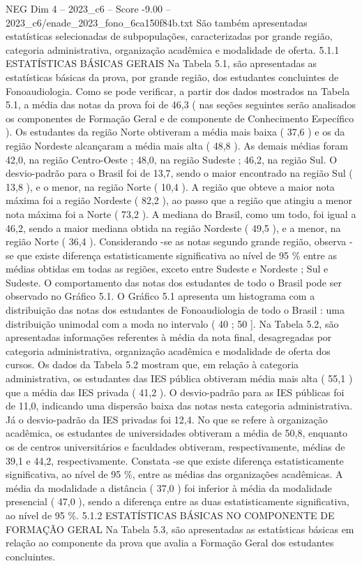 \begin{textsample}{NEG Dim 4 – 2023\_c6 – Score -9.00 – 2023\_c6/enade\_2023\_fono\_6ca150f84b.txt}
São também apresentadas estatísticas selecionadas de subpopulações, caracterizadas por grande região, categoria administrativa, organização acadêmica e modalidade de oferta. 5.1.1 ESTATÍSTICAS BÁSICAS GERAIS Na Tabela 5.1, são apresentadas as estatísticas básicas da prova, por grande região, dos estudantes concluintes de Fonoaudiologia.
Como se pode verificar, a partir dos dados mostrados na Tabela 5.1, a média das notas da prova foi de 46,3 ( nas seções seguintes serão analisados os componentes de Formação Geral e de componente de Conhecimento Específico ).
Os estudantes da região Norte obtiveram a média mais baixa ( 37,6 ) e os da região Nordeste alcançaram a média mais alta ( 48,8 ).
As demais médias foram 42,0, na região Centro-Oeste ; 48,0, na região Sudeste ; 46,2, na região Sul.
O desvio-padrão para o Brasil foi de 13,7, sendo o maior encontrado na região Sul ( 13,8 ), e o menor, na região Norte ( 10,4 ).
A região que obteve a maior nota máxima foi a região Nordeste ( 82,2 ), ao passo que a região que atingiu a menor nota máxima foi a Norte ( 73,2 ).
A mediana do Brasil, como um todo, foi igual a 46,2, sendo a maior mediana obtida na região Nordeste ( 49,5 ), e a menor, na região Norte ( 36,4 ).
Considerando -se as notas segundo grande região, observa -se que existe diferença estatisticamente significativa ao nível de 95 \% entre as médias obtidas em todas as regiões, exceto entre Sudeste e Nordeste ; Sul e Sudeste.
O comportamento das notas dos estudantes de todo o Brasil pode ser observado no Gráfico 5.1.
O Gráfico 5.1 apresenta um histograma com a distribuição das notas dos estudantes de Fonoaudiologia de todo o Brasil : uma distribuição unimodal com a moda no intervalo ( 40 ; 50 ].
Na Tabela 5.2, são apresentadas informações referentes à média da nota final, desagregadas por categoria administrativa, organização acadêmica e modalidade de oferta dos cursos.
Os dados da Tabela 5.2 mostram que, em relação à categoria administrativa, os estudantes das IES pública obtiveram média mais alta ( 55,1 ) que a média das IES privada ( 41,2 ).
O desvio-padrão para as IES públicas foi de 11,0, indicando uma dispersão baixa das notas nesta categoria administrativa.
Já o desvio-padrão da IES privadas foi 12,4.
No que se refere à organização acadêmica, os estudantes de universidades obtiveram a média de 50,8, enquanto os de centros universitários e faculdades obtiveram, respectivamente, médias de 39,1 e 44,2, respectivamente.
Constata -se que existe diferença estatisticamente significativa, ao nível de 95 \%, entre as médias das organizações acadêmicas.
A média da modalidade a distância ( 37,0 ) foi inferior à média da modalidade presencial ( 47,0 ), sendo a diferença entre as duas estatisticamente significativa, ao nível de 95 \%. 5.1.2 ESTATÍSTICAS BÁSICAS NO COMPONENTE DE FORMAÇÃO GERAL Na Tabela 5.3, são apresentadas as estatísticas básicas em relação ao componente da prova que avalia a Formação Geral dos estudantes concluintes.

\end{textsample}
